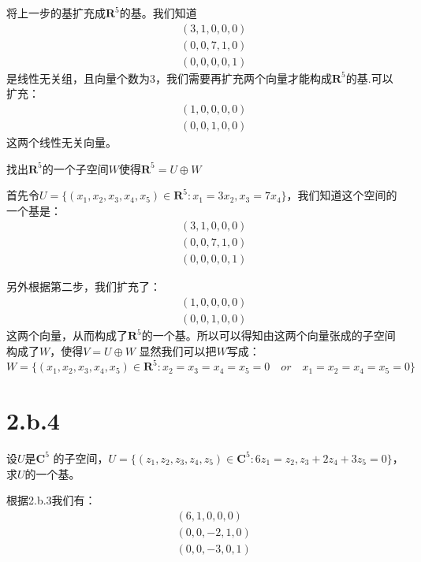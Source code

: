 \documentclass[10pt,a4paper,UTF8]{article}
\begin{document}
\begin{problem}
将上一步的基扩充成\(\mathbf{R}^{5}\)的基。我们知道
\begin{eqnarray*}
&&(3,1,0,0,0)\\
&&(0,0,7,1,0)\\
&&(0,0,0,0,1)
\end{eqnarray*}
是线性无关组，且向量个数为3，我们需要再扩充两个向量才能构成\(\mathbf{R}^{5}\)的基.可以扩充：
\begin{eqnarray*}
&&(1,0,0,0,0)\\
&&(0,0,1,0,0)
\end{eqnarray*}
这两个线性无关向量。
\end{problem}

\begin{problem}
找出\(\mathbf{R}^{5}\)的一个子空间\(W\)使得\(\mathbf{R}^{5} = U\oplus W\)
\end{problem}

\begin{answer}
首先令\(U=\{(x_{1},x_{2},x_{3},x_{4},x_{5})\in \mathbf{R}^{5}:x_{1}=3x_{2},x_{3}=7x_{4}\}\)，我们知道这个空间的一个基是：
\begin{eqnarray*}
&&(3,1,0,0,0)\\
&&(0,0,7,1,0)\\
&&(0,0,0,0,1)
\end{eqnarray*}

另外根据第二步，我们扩充了：
\begin{eqnarray*}
&&(1,0,0,0,0)\\
&&(0,0,1,0,0)
\end{eqnarray*}
这两个向量，从而构成了\(\mathbf{R}^{5}\)的一个基。所以可以得知由这两个向量张成的子空间构成了\(W\)，使得\(V = U\oplus W\)
显然我们可以把\(W\)写成：
\(W=\{(x_{1},x_{2},x_{3},x_{4},x_{5})\in \mathbf{R}^{5}:x_{2}=x_{3}=x_{4}=x_{5}=0 \quad or\quad x_{1}=x_{2}=x_{4}=x_{5}=0   \}\)
\end{answer}
\section*{2.b.4}
\label{sec:orgabae076}


\begin{problem}
设\(U\)是\(\mathbf{C}^{5}\) 的子空间，\(U=\{(z_{1},z_{2},z_{3},z_{4},z_{5})\in \mathbf{C}^{5}:6z_{1}=z_{2},z_{3} + 2z_{4} + 3z_{5} =0\}\)，求\(U\)的一个基。
\end{problem}

\begin{answer}
根据2.b.3我们有：
\begin{eqnarray*}
&&(6,1,0,0,0)\\
&&(0,0,-2,1,0)\\
&&(0,0,-3,0,1)
\end{eqnarray*}
\end{answer}
\end{document}
